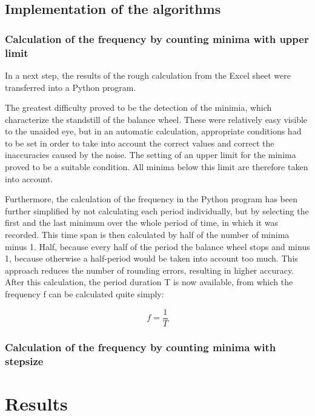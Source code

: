 \documentclass[12pt, a4paper]{report}
\begin{document}
    \section{Implementation of the algorithms}
    \subsection{Calculation of the frequency by counting minima with upper limit}
    
    In a next step, the results of the rough calculation from the Excel sheet were transferred into a Python program. 
    
    The greatest difficulty proved to be the detection of the minimia, which characterize the standstill of the balance wheel. These were relatively easy visible to the unaided eye, but in an automatic calculation, appropriate conditions had to be set in order to take into account the correct values and correct the inaccuracies caused by the noise. The setting of an upper limit for the minima proved to be a suitable condition. All minima below this limit are therefore taken into account. 
    
    Furthermore, the calculation of the frequency in the Python program has been further simplified by not calculating each period individually, but by selecting the first and the last minimum over the whole period of time, in which it was recorded. This time span is then calculated by half of the number of minima minus 1. Half, because every half of the period the balance wheel stops and minus 1, because otherwise a half-period would be taken into account too much. This approach reduces the number of rounding errors, resulting in higher accuracy. After this calculation, the period duration T is now available, from which the frequency f can be calculated quite simply: 
    
     \begin{displaymath}
      f = \frac{1}{T}
     \end{displaymath}
     
  \subsection{Calculation of the frequency by counting minima with stepsize}
    
    \chapter{Results}
    
\end{document}
